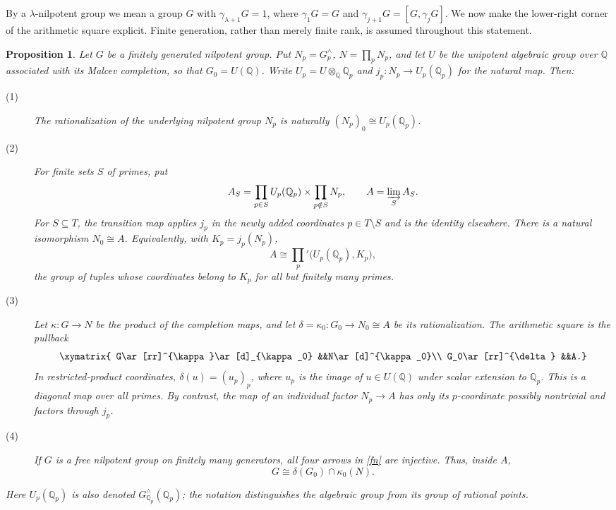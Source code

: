 \documentclass[11pt,a4paper]{article}
\newtheorem{proposition}[theorem]{Proposition}
\begin{document}
By a $\lambda$-nilpotent group we mean a group $G$ with
$\gamma_{\lambda+1}G=1$, where $\gamma_1G=G$ and
$\gamma_{j+1}G=[G,\gamma_jG]$.  We now make the lower-right corner of
the arithmetic square explicit.  Finite generation, rather than merely
finite rank, is assumed throughout this statement.
\begin{proposition}\label{asnfn}
Let $G$ be a finitely generated nilpotent group.  Put $N_p=G_p^{\wedge}$,
$N=\prod_pN_p$, and let $U$ be the unipotent algebraic group over
$\mathbb Q$ associated with its Malcev completion, so that
$G_0=U(\mathbb Q)$.  Write $U_p=U\otimes_{\mathbb Q}\mathbb Q_p$ and
$j_p:N_p\to U_p(\mathbb Q_p)$ for the natural map.  Then:
\begin{description}
\item[(1)] The rationalization of the underlying nilpotent group $N_p$
is naturally $(N_p)_0\cong U_p(\mathbb Q_p)$.
\item[(2)] For finite sets $S$ of primes, put
\[
 A_S=\prod_{p\in S}U_p(\mathbb Q_p)\times\prod_{p\notin S}N_p,
 \qquad A=\varinjlim_{S}A_S.
\]
For $S\subseteq T$, the transition map applies $j_p$ in the newly added
coordinates $p\in T\setminus S$ and is the identity elsewhere.  There
is a natural isomorphism $N_0\cong A$.  Equivalently, with
$K_p=j_p(N_p)$,
\[
 A\cong\prod_p'\bigl(U_p(\mathbb Q_p),K_p\bigr),
\]
the group of tuples whose coordinates belong to $K_p$ for all but
finitely many primes.
\item[(3)] Let $\kappa:G\to N$ be the product of the completion maps,
and let $\delta=\kappa_0:G_0\to N_0\cong A$ be its rationalization.
The arithmetic square is the pullback
\begin{equation}\label{fn}
\xymatrix{
 G\ar[rr]^{\kappa}\ar[d]_{\kappa_0} &&N\ar[d]^{\kappa_0}\\
 G_0\ar[rr]^{\delta} &&A.}
\end{equation}
In restricted-product coordinates,
$\delta(u)=(u_p)_p$, where $u_p$ is the image of $u\in U(\mathbb Q)$
under scalar extension to $\mathbb Q_p$.  This is a diagonal map over
\emph{all} primes.  By contrast, the map of an individual factor
$N_p\to A$ has only its $p$-coordinate possibly nontrivial and factors
through $j_p$.
\item[(4)] If $G$ is a free nilpotent group on finitely many generators,
all four arrows in \eqref{fn} are injective.  Thus, inside $A$,
\[
 G\cong\delta(G_0)\cap\kappa_0(N).
\]
\end{description}
Here $U_p(\mathbb Q_p)$ is also denoted
$G_{\mathbb Q_p}^{\wedge}(\mathbb Q_p)$; the notation distinguishes the
algebraic group from its group of rational points.
\end{proposition}
\end{document}
